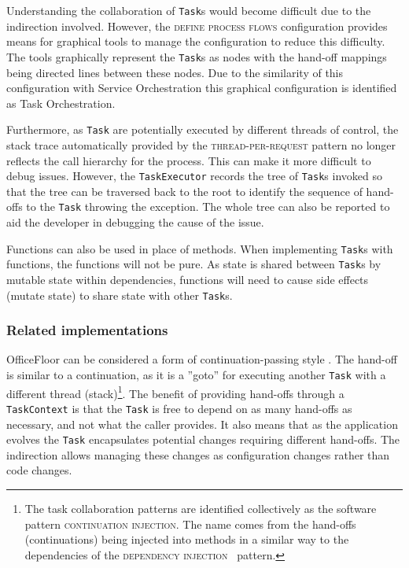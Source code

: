 \documentclass[prodmode]{style/acmlarge}
\begin{document}
Understanding the collaboration of \texttt{Task}s would become difficult due to
the indirection involved.  However, the \textsc{define process flows}
configuration provides means for graphical tools to manage the configuration to
reduce this difficulty.  The tools graphically represent the \texttt{Task}s as
nodes with the hand-off mappings being directed lines between these nodes.  Due
to the similarity of this configuration with Service Orchestration this
graphical configuration is identified as Task Orchestration.

Furthermore, as \texttt{Task} are potentially executed by different threads of
control, the stack trace automatically provided by the
\textsc{thread-per-request} pattern no longer reflects the call hierarchy for
the process.  This can make it more difficult to debug issues.  However, the
\texttt{TaskExecutor} records the tree of \texttt{Task}s invoked so that the
tree can be traversed back to the root to identify the sequence of hand-offs to
the \texttt{Task} throwing the exception.  The whole tree can also be reported
to aid the developer in debugging the cause of the issue.

Functions can also be used in place of methods.  When implementing
\texttt{Task}s with functions, the functions will not be pure.  As state is
shared between \texttt{Task}s by mutable state within dependencies, functions
will need to cause side effects (mutate state) to share state with other
\texttt{Task}s.



\subsubsection*{Related implementations}

OfficeFloor can be considered a form of continuation-passing style
\cite{continuations}.  The hand-off is similar to a continuation, as it is a
''goto'' for executing another \texttt{Task} with a different thread
(stack)\footnote{The task collaboration patterns are identified collectively as
the software pattern \textsc{continuation injection}.  The name comes from the
hand-offs (continuations) being injected into methods in a similar way to the
dependencies of the \textsc{dependency injection}~\cite{ioc} pattern.}.  The
benefit of providing hand-offs through a \texttt{TaskContext} is that the
\texttt{Task} is free to depend on as many hand-offs as necessary, and not what
the caller provides.  It also means that as the application evolves the
\texttt{Task} encapsulates potential changes requiring different hand-offs.  The
indirection allows managing these changes as configuration changes rather than
code changes.
\end{document}
